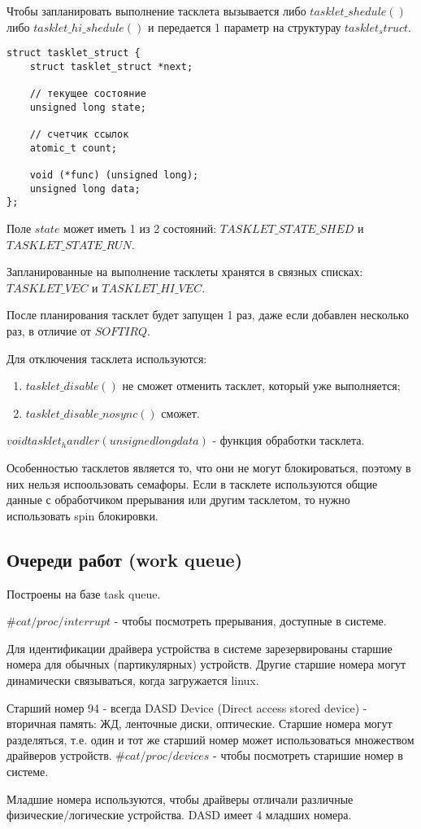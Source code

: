 Чтобы запланировать выполнение тасклета вызывается либо $tasklet\_shedule()$ либо $tasklet\_hi\_shedule()$ и передается 1 параметр на структурау $tasklet_struct$.
\begin{lstlisting}[caption = Структура $tasklet\_struct$]
struct tasklet_struct {
	struct tasklet_struct *next;

	// текущее состояние
	unsigned long state;

	// счетчик ссылок 
	atomic_t count;
	
	void (*func) (unsigned long);
	unsigned long data;
};
\end{lstlisting}

Поле $state$ может иметь 1 из 2 состояний: $TASKLET\_STATE\_SHED$ и $TASKLET\_STATE\_RUN$.

Запланированные на выполнение тасклеты хранятся в связных списках: $TASKLET\_VEC$ и $TASKLET\_HI\_VEC$.

После планирования тасклет будет запущен 1 раз, даже если добавлен несколько раз, в отличие от $SOFTIRQ$.

Для отключения тасклета используются:
\begin{enumerate}
	\item $tasklet\_disable()$ не сможет отменить тасклет, который уже выполняется;
	\item $tasklet\_disable\_nosync()$ сможет.
\end{enumerate}

$void tasklet_handler(unsigned long data)$ - функция обработки тасклета.

Особенностью тасклетов является то, что они не могут блокироваться, поэтому в них нельзя испоользовать семафоры. Если в тасклете используются общие данные с обработчиком прерывания или другим тасклетом, то нужно использовать spin блокировки.

\subsection{Очереди работ (work queue)}
Построены на базе task queue.

$\# cat /proc/interrupt$ - чтобы посмотреть прерывания, доступные в системе.

Для идентификации драйвера устройства в системе зарезервированы старшие номера для обычных (партикулярных) устройств. Другие старшие номера могут динамически связываться, когда загружается linux. 

Старший номер 94 - всегда DASD Device (Direct access stored device) - вторичная память: ЖД, ленточные диски, оптические.
Старшие номера могут разделяться, т.е. один и тот же старший номер может использоваться множеством драйверов устройств.
$\# cat /proc/devices$ - чтобы посмотреть старишие номер в системе.

Младшие номера используются, чтобы драйверы отличали различные физические/логические устройства. DASD имеет 4 младших номера.